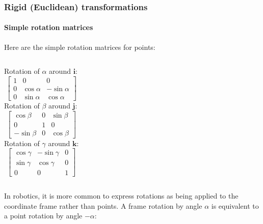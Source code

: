 \documentclass[aspectratio=169]{beamer}
\renewcommand{\vec}[1]{\boldsymbol{#1}}
\begin{document}
\begin{frame}
\frametitle{Rigid (Euclidean) transformations}
\framesubtitle{Simple rotation matrices}

Here are the simple rotation matrices for \alert{points}:

\medskip

\begin{columns}
\column{1.5in}
Rotation of $\alpha$ around $\vec{i}$:
\begin{equation*}
\begin{bmatrix}
1 & 0 & 0 \\
0 & \cos \alpha & -\sin \alpha \\
0 & \sin \alpha & \cos \alpha
\end{bmatrix}
\end{equation*}
\column{1.5in}
Rotation of $\beta$ around $\vec{j}$:
\begin{equation*}
\begin{bmatrix}
\cos \beta & 0 & \sin \beta \\
0 & 1 & 0 \\
-\sin \beta & 0 & \cos \beta
\end{bmatrix}
\end{equation*}
\column{1.5in}
Rotation of $\gamma$ around $\vec{k}$:
\begin{equation*}
\begin{bmatrix}
\cos \gamma & -\sin \gamma & 0 \\
\sin \gamma & \cos \gamma & 0 \\
0 & 0 & 1
\end{bmatrix}
\end{equation*}
\end{columns}

\medskip

In robotics, it is more common to express rotations as being applied to the
\alert{coordinate frame} rather than points. A frame rotation by angle
$\alpha$ is equivalent to a point rotation by angle $-\alpha$:

\medskip


\end{frame}
\end{document}
